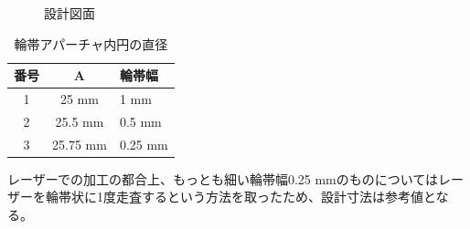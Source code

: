 \documentclass[dvipdfmx,autodetect-engine]{jreport}
\begin{document}
\begin{figure}[h!]
\centering

\caption[]{設計図面}
\label{fig:lens_pinhole_ring_aperture}
\end{figure}

\begin{table}[h]
\begin{center}
  \begin{tabular}{|c|c|l|} \hline
    番号 & A & 輪帯幅 \\ \hline
    1 & 25 mm & 1 mm \\
    2 & 25.5 mm & 0.5 mm \\
    3 & 25.75 mm & 0.25 mm \\ \hline
  \end{tabular}
  \caption{輪帯アパーチャ内円の直径}
  \label{tb:lens_ring_aperture_inner_diameter}
\end{center}
\end{table}

レーザーでの加工の都合上、もっとも細い輪帯幅0.25 mmのものについてはレーザーを輪帯状に1度走査するという方法を取ったため、設計寸法は参考値となる。
\end{document}
